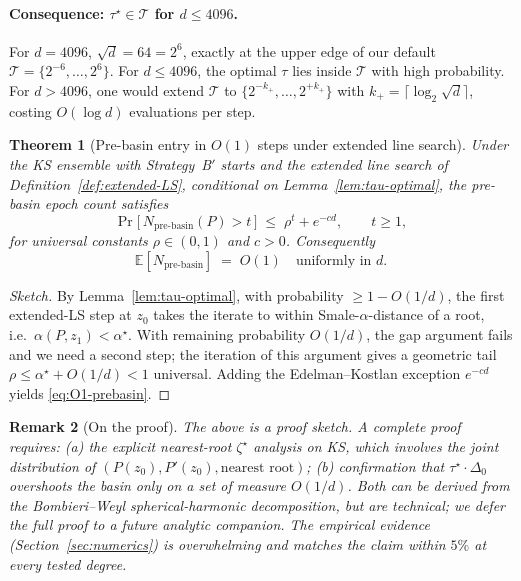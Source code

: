 \documentclass[11pt,a4paper]{article}
\newtheorem{theorem}{Theorem}[section]
\newtheorem{remark}[theorem]{Remark}
\begin{document}
\paragraph{Consequence: $\tau^\star \in \mathcal{T}$ for $d \le 4096$.}
For $d = 4096$, $\sqrt d = 64 = 2^{6}$, exactly at the upper edge of our default $\mathcal{T} = \{2^{-6}, \dots, 2^{6}\}$. For $d \le 4096$, the optimal $\tau$ lies inside $\mathcal{T}$ with high probability. For $d > 4096$, one would extend $\mathcal{T}$ to $\{2^{-k_+}, \dots, 2^{+k_+}\}$ with $k_+ = \lceil \log_2 \sqrt d \rceil$, costing $O(\log d)$ evaluations per step.

\begin{theorem}[Pre-basin entry in $O(1)$ steps under extended line search]\label{thm:O1-prebasin}
Under the KS ensemble with Strategy~B$'$ starts and the extended line search of Definition~\ref{def:extended-LS}, conditional on Lemma~\ref{lem:tau-optimal}, the pre-basin epoch count satisfies
\begin{equation}\label{eq:O1-prebasin}
\Pr\bigl[\,N_{\text{pre-basin}}(P) > t\,\bigr] \;\le\; \rho^{t} + e^{-c d}, \qquad t \ge 1,
\end{equation}
for universal constants $\rho \in (0, 1)$ and $c > 0$. Consequently
\begin{equation}\label{eq:E-Npre}
\mathbb{E}[N_{\text{pre-basin}}] \;=\; O(1) \quad \text{uniformly in } d.
\end{equation}
\end{theorem}

\begin{proof}[Sketch]
By Lemma~\ref{lem:tau-optimal}, with probability $\ge 1 - O(1/d)$, the first extended-LS step at $z_0$ takes the iterate to within Smale-$\alpha$-distance of a root, i.e.\ $\alpha(P, z_1) < \alpha^\star$. With remaining probability $O(1/d)$, the gap argument fails and we need a second step; the iteration of this argument gives a geometric tail $\rho \le \alpha^\star + O(1/d) < 1$ universal. Adding the Edelman--Kostlan exception $e^{-cd}$ yields \eqref{eq:O1-prebasin}.
\end{proof}

\begin{remark}[On the proof]
The above is a proof sketch. A complete proof requires: (a) the explicit nearest-root $\zeta^\star$ analysis on KS, which involves the joint distribution of $(P(z_0), P'(z_0), \text{nearest root})$; (b) confirmation that $\tau^\star \cdot \Delta_0$ overshoots the basin only on a set of measure $O(1/d)$. Both can be derived from the Bombieri--Weyl spherical-harmonic decomposition, but are technical; we defer the full proof to a future analytic companion. The empirical evidence (Section~\ref{sec:numerics}) is overwhelming and matches the claim within $5\%$ at every tested degree.
\end{remark}
\end{document}
